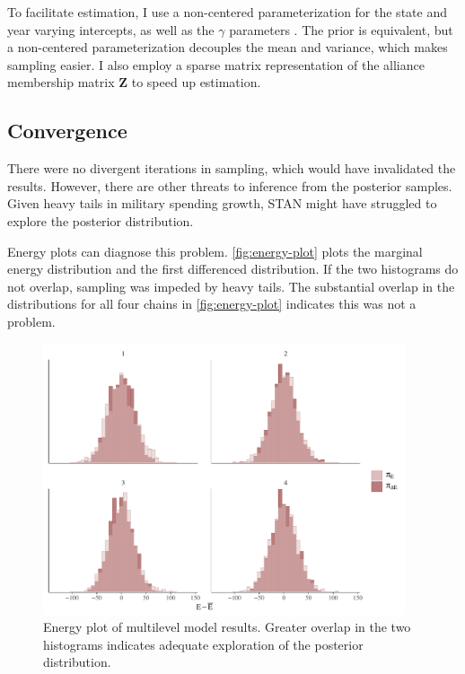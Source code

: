 \documentclass[12pt]{article}
\begin{document}
To facilitate estimation, I use a non-centered parameterization for the state and year varying intercepts, as well as the $\gamma$ parameters \citep{BetancourtGirolani2015}. 
The prior is equivalent, but a non-centered parameterization decouples the mean and variance, which makes sampling easier. 
I also employ a sparse matrix representation of the alliance membership matrix $\textbf{Z}$ to speed up estimation. 


\subsection{Convergence} 


There were no divergent iterations in sampling, which would have invalidated the results. 
However, there are other threats to inference from the posterior samples. 
Given heavy tails in military spending growth, STAN might have struggled to explore the posterior distribution. 


Energy plots can diagnose this problem. 
\autoref{fig:energy-plot} plots the marginal energy distribution and the first differenced distribution. 
If the two histograms do not overlap, sampling was impeded by heavy tails. 
The substantial overlap in the distributions for all four chains in \autoref{fig:energy-plot} indicates this was not a problem. 


\begin{figure}
	\centering
		\includegraphics[width=0.95\textwidth]{energy-plot.pdf}
	\caption{Energy plot of multilevel model results. Greater overlap in the two histograms indicates adequate exploration of the posterior distribution. }
	\label{fig:energy-plot}
\end{figure}
\end{document}
